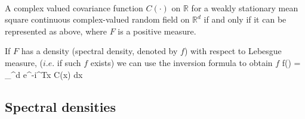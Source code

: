 \begin{thm}\hfill \\
	
	A complex valued covariance function $C(\cdot)$ on $\mathbb{R}$ for a weakly stationary mean square continuous complex-valued random field on $\mathbb{R}^d$ if and only if it can be represented as above, where $F$ is a positive measure.
\end{thm}

If $F$ has a density (spectral density, denoted by $f$) with respect to Lebesgue measure, ($i.e.$ if such $f$ exists) we can use the inversion formula to obtain $f$
\beq
f(\omega) =   \int_{^d} e^{-i\omega^Tx} C(x) dx
\eeq

\subsection{Spectral densities}

